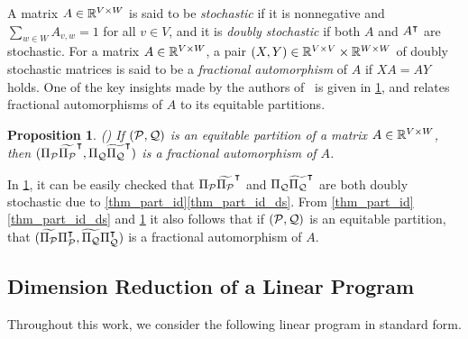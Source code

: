 \documentclass[pdflatex,sn-mathphys-num]{sn-jnl}%
\theoremstyle{thmstyleone}%
\newtheorem{proposition}[proposition]{Proposition}
\theoremstyle{thmstylethree}%
\theoremstyle{thmstyletwo}%
\begin{document}
A matrix $A\in \mathbb{R}^{V\times W}$ is said to be \emph{stochastic} if it is nonnegative and $\sum_{w\in W} A_{v,w} = 1$ for all $v\in V$, and it is \emph{doubly stochastic} if both $A$ and $A^{\intercal}$ are stochastic. For a matrix $A\in \mathbb{R}^{V\times W}$, a pair $(X,Y) \in \mathbb{R}^{V\times V} \times \mathbb{R}^{W\times W}$ of doubly stochastic matrices is said to be a \emph{fractional automorphism} of $A$ if $XA = AY$ holds. One of the key insights made by the authors of~\cite{Grohe2014} is given in \cref{thm_frac_aut_equitable_partition}, and relates fractional automorphisms of $A$ to its equitable partitions.
\begin{proposition}(\cite{Grohe2014})
\label{thm_frac_aut_equitable_partition}
    If $(\mathcal{P},\mathcal{Q})$ is an equitable partition of a matrix $A\in \mathbb{R}^{V\times W}$, then $(\Pi_{\mathcal{P}} \widetilde{\Pi_{\mathcal{P}}}^{\intercal}, \Pi_{\mathcal{Q}} \widetilde{\Pi_{\mathcal{Q}}}^{\intercal})$ is a fractional automorphism of $A$.
\end{proposition}
In \cref{thm_frac_aut_equitable_partition}, it can be easily checked that $\Pi_{\mathcal{P}} \widetilde{\Pi_{\mathcal{P}}}^{\intercal}$ and $\Pi_{\mathcal{Q}} \widetilde{\Pi_{\mathcal{Q}}}^{\intercal}$ are both doubly stochastic due to \cref{thm_part_id}\ref{thm_part_id_ds}. From \cref{thm_part_id}\ref{thm_part_id_ds} and \cref{thm_frac_aut_equitable_partition} it also follows that if $(\mathcal{P},\mathcal{Q})$ is an equitable partition, that $(\widetilde{\Pi_{\mathcal{P}}} \Pi_{\mathcal{P}}^{\intercal}, \widetilde{\Pi_{\mathcal{Q}}} \Pi_{\mathcal{Q}}^{\intercal})$ is a fractional automorphism of $A$. 

\subsection{Dimension Reduction of a Linear Program}

Throughout this work, we consider the following linear program in standard form.
\end{document}
